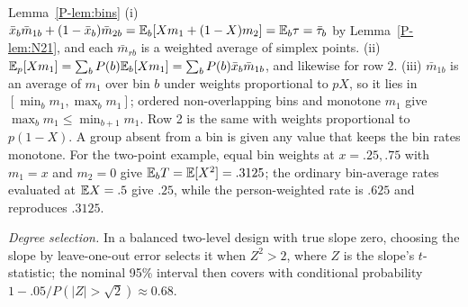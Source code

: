 \begin{proofof}{Lemma~\ref{P-lem:bins}}
(i) $\bar x_b\bar m_{1b}+(1-\bar x_b)\bar m_{2b}=\mathbb E_b[Xm_1+(1-X)m_2]=\mathbb E_b\tau=\bar\tau_b$ by
Lemma~\ref{P-lem:N21}, and each $\bar m_{rb}$ is a weighted average of simplex points.
(ii) $\mathbb E_p[Xm_1]=\sum_bP(b)\mathbb E_b[Xm_1]=\sum_bP(b)\bar x_b\bar m_{1b}$, and likewise for row 2.
(iii) $\bar m_{1b}$ is an average of $m_1$ over bin $b$ under weights proportional to
$pX$, so it lies in $[\min_bm_1,\max_bm_1]$; ordered non-overlapping bins and monotone
$m_1$ give $\max_bm_1\le\min_{b+1}m_1$. Row 2 is the same with weights proportional to
$p(1-X)$. A group absent from a bin is given any value that keeps the bin rates
monotone. For the two-point example, equal bin weights at $x=.25,.75$ with $m_1=x$ and
$m_2=0$ give $\mathbb E_bT=\mathbb E[X^2]=.3125$; the ordinary bin-average rates evaluated at
$\mathbb E X=.5$ give $.25$, while the person-weighted rate is $.625$ and reproduces $.3125$.
\end{proofof}

\emph{Degree selection.} In a balanced two-level design with true slope zero, choosing
the slope by leave-one-out error selects it when $Z^2>2$, where $Z$ is the slope's
$t$-statistic; the nominal 95\% interval then covers with conditional probability
$1-.05/P(|Z|>\sqrt2)\approx0.68$.
